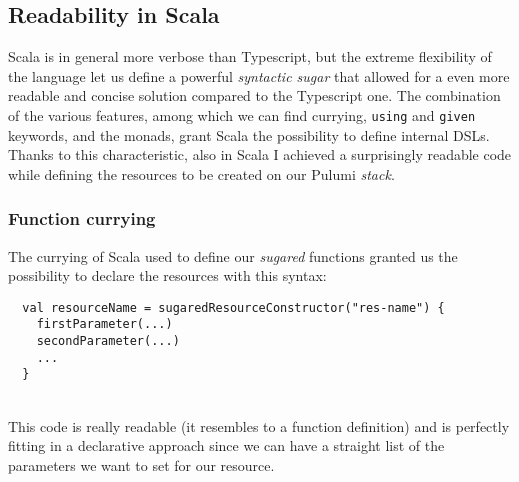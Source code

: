 \subsection{Readability in Scala}
Scala is in general more verbose than Typescript, but the extreme flexibility of the language let us define a powerful \textit{syntactic sugar} that allowed for a even more readable and concise solution compared to the Typescript one.
The combination of the various features, among which we can find currying, \texttt{using} and \texttt{given} keywords, and the monads, grant Scala the possibility to define \gls{internal DSL}s.
Thanks to this characteristic, also in Scala I achieved a surprisingly readable code while defining the resources to be created on our Pulumi \textit{stack}.

\subsubsection{Function currying}
The currying of Scala used to define our \textit{sugared} functions granted us the possibility to declare the resources with this syntax:
\begin{verbatim}
  val resourceName = sugaredResourceConstructor("res-name") {
    firstParameter(...)
    secondParameter(...)
    ...
  }
\end{verbatim}\mbox{}\\
This code is really readable (it resembles to a function definition) and is perfectly fitting in a declarative approach since we can have a straight list of the parameters we want to set for our resource.\\

